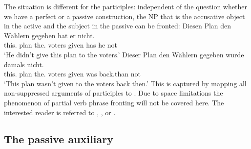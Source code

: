 \zl
The situation is different for the participles: independent of the question whether we have a
perfect or a passive construction, the NP that is the accusative object in the active and the
subject in the passive can be fronted:
\eal
\ex 
\gll Diesen      Plan den        Wählern gegeben hat er nicht.\\
     this.\ACC{} plan the.\DAT{} voters  given   has he not\\
\glt `He didn't give this plan to the voters.'
\ex 
\gll Dieser Plan den Wählern gegeben wurde damals nicht.\\
     this.\NOM{} plan the.\DAT{} voters given was back.than not\\
\glt `This plan wasn't given to the voters back then.'
\zl
This is captured by mapping all non-suppressed arguments of participles to \comps. Due to space
limitations the phenomenon of partial verb phrase fronting will not be covered here. The interested
reader is referred to , , or .






\subsection{The passive auxiliary}
\label{sec-auxiliary}

